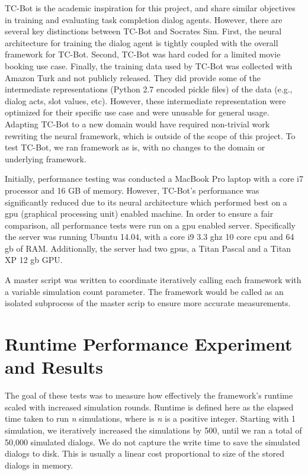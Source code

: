  TC-Bot is the academic inspiration for this project, and share similar objectives in training and evaluating task completion dialog agents. However, there are several key distinctions between TC-Bot and Socrates Sim. First, the neural architecture for training the dialog agent is tightly coupled with the overall framework for TC-Bot. Second, TC-Bot was hard coded for a limited movie booking use case. Finally, the training data used by TC-Bot was collected with Amazon Turk and not publicly released. They did provide some of the intermediate representations (Python 2.7 encoded pickle files) of the data (e.g., dialog acts, slot values, etc). However, these intermediate representation were optimized for their specific use case and were unusable for general usage. Adapting TC-Bot to a new domain would have required non-trivial work rewriting the neural framework, which is outside of the scope of this project. To test TC-Bot, we ran framework as is, with no changes to the domain or underlying framework. 

Initially, performance testing was conducted a MacBook Pro laptop with a core i7 processor and 16 GB of memory. However, TC-Bot's performance was significantly reduced due to its neural architecture which performed best on a gpu (graphical processing unit) enabled machine. In order to ensure a fair comparison, all performance tests were run on a gpu enabled server. Specifically the server was running Ubuntu 14.04, with a core i9 3.3 ghz 10 core cpu and  64 gb of RAM. Additionally, the server had two gpus, a Titan Pascal and a Titan XP 12 gb GPU. 

A master script was written to coordinate iteratively calling each framework with a variable simulation count parameter. The framework would be called as an isolated subprocess of the master scrip to ensure more accurate measurements. 

\section{Runtime Performance Experiment and Results}

The goal of these tests was to measure how effectively the framework's runtime scaled with increased simulation rounds. Runtime is defined here as the elapsed time taken to run \textit{n} simulations, where is \textit{n} is a positive integer. Starting with 1 simulation, we iteratively increased the simulations by 500, until we ran a total of 50,000 simulated dialogs. We do not capture the write time to save the simulated dialogs to disk. This is usually a linear cost proportional to size of the stored dialogs in memory. 

